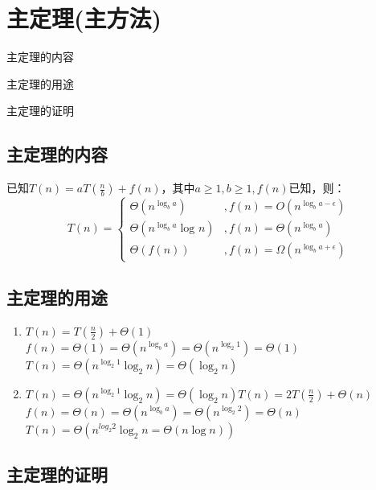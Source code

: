 \chapter{主定理(主方法)}
\begin{introduction}
  \item 主定理的内容
  \item 主定理的用途
  \item 主定理的证明
\end{introduction}

\section{主定理的内容}
已知$T(n) = a T(\frac{n}{b}) + f(n)$，其中$a\geq 1, b\geq 1, f(n)$已知，则：
\begin{equation}
  T(n)=\begin{cases}
    \Theta(n^{\log_{b}{a}} )           & ,f(n) = O(n^{\log_{b}{a} - \epsilon} )       \\
    \Theta(n^{\log_{b}{a}}\log_{}{n} ) & ,f(n) = \Theta(n^{\log_{b}{a}} )             \\
    \Theta (f(n))                      & ,f(n) = \Omega (n^{\log_{b}{a} + \epsilon} )
  \end{cases}
\end{equation}
\section{主定理的用途}
\begin{enumerate}
  \item $T (n)=T\left(\frac{n}{2}\right)+\Theta(1)$\\
        $f (n)=\Theta(1)=\Theta\left(n^{\log _{b} a}\right)=\Theta\left(n^{\log _{2} 1}\right)=\Theta(1)$\\
        $T (n)=\Theta\left(n^{\log _{2} 1} \log _{2} n\right)=\Theta\left(\log _{2} n\right)$
  \item $T (n)=\Theta\left(n^{\log _{2} 1} \log _{2} n\right)=\Theta\left(\log _{2} n\right)T(n)=2 T\left(\frac{n}{2}\right)+\Theta(n)$\\
  $f (n)=\Theta(n)=\Theta\left(n^{\log _{b} a}\right)=\Theta\left(n^{\log _{2} 2}\right)=\Theta(n)$\\
  $T (n)=\Theta\left(n^{l o g_{2} 2} \log _{2} n=\Theta(n \log n)\right)$
\end{enumerate}
\section{主定理的证明}
